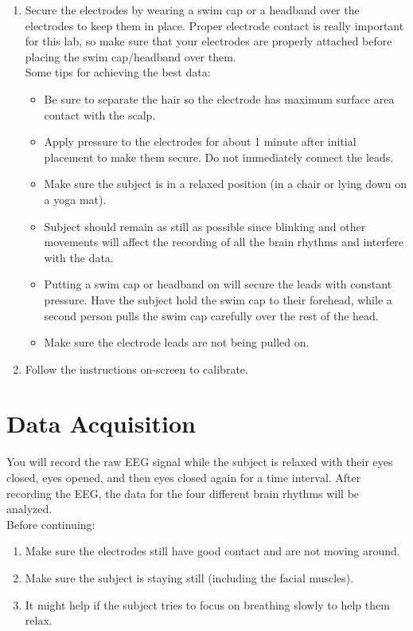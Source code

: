 \documentclass{article}
\begin{document}
\begin{enumerate}
	\item Secure the electrodes by wearing a swim cap or a headband over the electrodes to keep them in place. Proper electrode contact is really important for this lab, so make sure that your electrodes are properly attached before placing the swim cap/headband over them.\\
	
		Some tips for achieving the best data:
		\begin{itemize}
			\item Be sure to separate the hair so the electrode has maximum surface area contact with the scalp.
			\item Apply pressure to the electrodes for about 1 minute after initial placement to make them secure. Do not immediately connect the leads.
			\item Make sure the subject is in a relaxed position (in a chair or lying down on a yoga mat).
			\item Subject should remain as still as possible since blinking and other movements will affect the recording of all the brain rhythms and interfere with the data.
			\item Putting a swim cap or headband on will secure the leads with constant pressure. Have the subject hold the swim cap to their forehead, while a second person pulls the swim cap carefully over the rest of the head.
			\item Make sure the electrode leads are not being pulled on.
		\end{itemize}
	\item Follow the instructions on-screen to calibrate.
\end{enumerate}

\section*{Data Acquisition}
You will record the raw EEG signal while the subject is relaxed with their eyes closed, eyes opened, and then eyes closed again for a time interval. After recording the EEG, the data for the four different brain rhythms will be analyzed.\\

Before continuing:
\begin{enumerate}
	\item Make sure the electrodes still have good contact and are not moving around.
	\item Make sure the subject is staying still (including the facial muscles).
	\item It might help if the subject tries to focus on breathing slowly to help them relax.
\end{enumerate}
\end{document}
